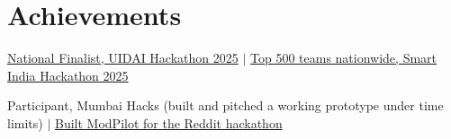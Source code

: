 \documentclass[a4paper,10pt]{article}
\begin{document}
\section{Achievements}
 \begin{itemize}[leftmargin=0.18in, itemsep=0pt, topsep=2pt]
    \small{
    \item \href{https://github.com/gogul098/UIDAI}{National Finalist, UIDAI Hackathon 2025} $|$ \href{https://github.com/gogul098/SIHimpo}{Top 500 teams nationwide, Smart India Hackathon 2025}
    \item Participant, Mumbai Hacks (built and pitched a working prototype under time limits) $|$ \href{https://github.com/gogul098/Reddit-bot}{Built ModPilot for the Reddit hackathon}
    }
 \end{itemize}
\end{document}
